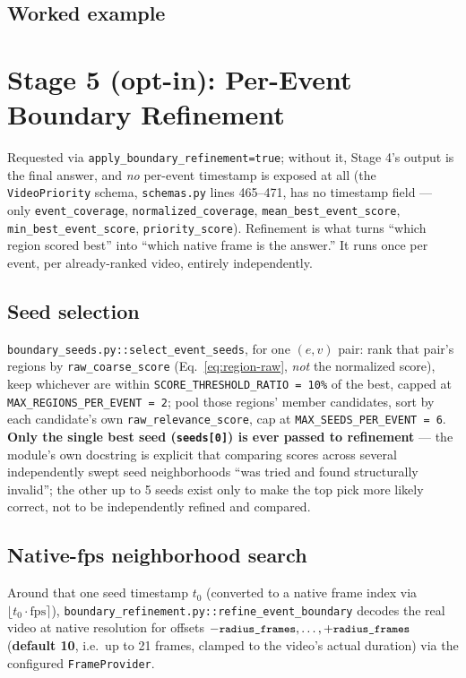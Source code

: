 \documentclass[11pt]{article}
\newcommand{\code}[1]{\texttt{\small #1}}
\newcommand{\file}[1]{\texttt{\footnotesize #1}}
\newcommand{\corr}[1]{\textbf{\textcolor{red!60!black}{#1}}}
\begin{document}
\subsection{Worked example}


\section{Stage 5 (opt-in): Per-Event Boundary Refinement}
\label{sec:stage5}

Requested via \code{apply\_boundary\_refinement=true}; without it, Stage 4's
output is the final answer, and \emph{no} per-event timestamp is exposed at
all (the \code{VideoPriority} schema, \file{schemas.py} lines 465--471, has
no timestamp field --- only \code{event\_coverage},
\code{normalized\_coverage}, \code{mean\_best\_event\_score},
\code{min\_best\_event\_score}, \code{priority\_score}). Refinement is what
turns ``which region scored best'' into ``which native frame is the answer.''
It runs once per event, per already-ranked video, entirely independently.

\subsection{Seed selection}
\file{boundary\_seeds.py::select\_event\_seeds}, for one $(e, v)$ pair: rank
that pair's regions by \code{raw\_coarse\_score} (Eq.~\ref{eq:region-raw},
\emph{not} the normalized score), keep whichever are within
\code{SCORE\_THRESHOLD\_RATIO = 10\%} of the best, capped at
\code{MAX\_REGIONS\_PER\_EVENT = 2}; pool those regions' member candidates,
sort by each candidate's own \code{raw\_relevance\_score}, cap at
\code{MAX\_SEEDS\_PER\_EVENT = 6}. \corr{Only the single best seed
(\code{seeds[0]}) is ever passed to refinement} --- the module's own
docstring is explicit that comparing scores across several independently
swept seed neighborhoods ``was tried and found structurally invalid''; the
other up to 5 seeds exist only to make the top pick more likely correct, not
to be independently refined and compared.

\subsection{Native-fps neighborhood search}
Around that one seed timestamp $t_0$ (converted to a native frame index via
$\lfloor t_0 \cdot \mathrm{fps} \rceil$), \code{boundary\_refinement.py::refine\_event\_boundary}
decodes the real video at native resolution for offsets
$-\code{radius\_frames}, \dots, +\code{radius\_frames}$
(\textbf{default 10}, i.e.\ up to 21 frames, clamped to the video's actual
duration) via the configured \code{FrameProvider}.
\end{document}
